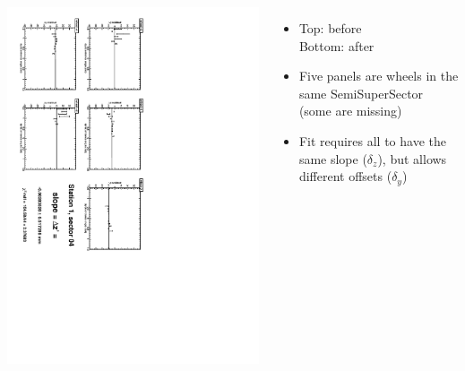 \documentclass[compress]{beamer}
\begin{document}
\begin{frame}
\begin{columns}
\vfill
\includegraphics[height=\linewidth, angle=90]{zfits_after/zfit_1_04.pdf}
\begin{itemize}
\item Top: before \\ Bottom: after
\item Five panels are wheels in the same SemiSuperSector (some are missing)
\item Fit requires all to have the same slope ($\delta_z$), but allows different offsets ($\delta_y$)
\end{itemize}
\end{columns}
\end{frame}
\end{document}

